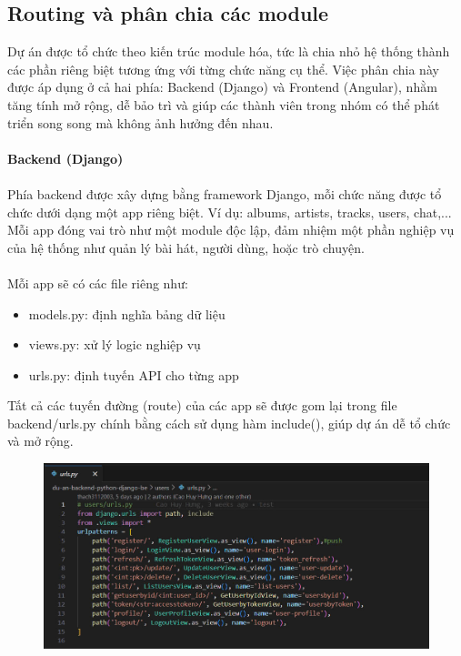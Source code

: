 \documentclass[a4paper]{article}
\begin{document}
\subsection{Routing và phân chia các module}
Dự án được tổ chức theo kiến trúc module hóa, tức là chia nhỏ hệ thống thành các phần riêng biệt tương ứng với từng chức năng cụ thể. Việc phân chia này được áp dụng ở cả hai phía: Backend (Django) và Frontend (Angular), nhằm tăng tính mở rộng, dễ bảo trì và giúp các thành viên trong nhóm có thể phát triển song song mà không ảnh hưởng đến nhau.\\
\\
\textbf{Backend (Django)}\\
\\
Phía backend được xây dựng bằng framework Django, mỗi chức năng được tổ chức dưới dạng một app riêng biệt. Ví dụ: albums, artists, tracks, users, chat,... Mỗi app đóng vai trò như một module độc lập, đảm nhiệm một phần nghiệp vụ của hệ thống như quản lý bài hát, người dùng, hoặc trò chuyện.\\
\\
Mỗi app sẽ có các file riêng như:\\
\begin{itemize}
    \item models.py: định nghĩa bảng dữ liệu
    \item views.py: xử lý logic nghiệp vụ
    \item urls.py: định tuyến API cho từng app
\end{itemize}
Tất cả các tuyến đường (route) của các app sẽ được gom lại trong file backend/urls.py chính bằng cách sử dụng hàm include(), giúp dự án dễ tổ chức và mở rộng.\\

\begin{figure}[H]
    \centering
    \includegraphics[width=0.9\linewidth]{img/userUrls.jpg}
    \label{fig:enter-label}
\end{figure}
\end{document}
